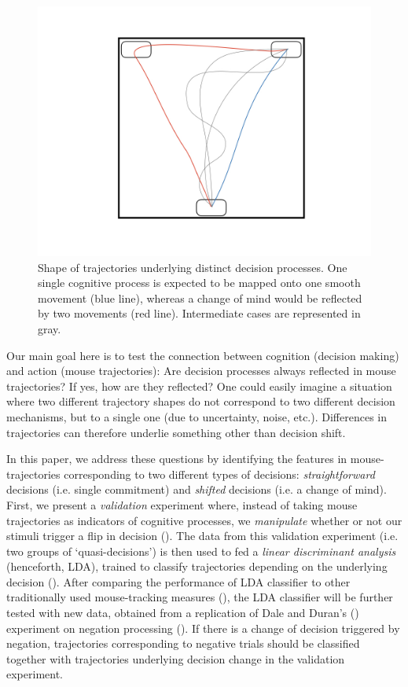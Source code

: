 \documentclass{article}
\begin{document}
\begin{figure}
\centering
\includegraphics[width=\textwidth]{trajectories.jpeg}
\caption{Shape of trajectories underlying distinct decision processes. One single cognitive process is expected to be mapped onto one smooth movement (blue line), whereas a change of mind would be reflected by two movements (red line). Intermediate cases are represented in gray.} \label{fig:scheme.traj}
\end{figure}

Our main goal here is to test the connection between cognition (decision making) and action (mouse trajectories): Are decision processes always reflected in mouse trajectories? If yes, how are they reflected? 
One could easily imagine a situation where two different trajectory shapes do not correspond to two different decision mechanisms, but to a single one (due to uncertainty, noise, etc.). Differences in trajectories can therefore underlie something other than decision shift. 

In this paper, we address these questions by identifying the features in mouse-trajectories corresponding to two different types of decisions: \emph{straightforward} decisions (i.e. single commitment) and \emph{shifted} decisions (i.e. a change of mind). 
First, we present a \emph{validation} experiment where, instead of taking mouse trajectories as indicators of cognitive processes, we \emph{manipulate} whether or not our stimuli trigger a flip in decision (). 
The data from this validation experiment (i.e. two groups of `quasi-decisions') is then used to fed a \emph{linear discriminant analysis} (henceforth, LDA), trained to classify trajectories depending on the underlying decision (). 
After comparing the performance of LDA classifier to other traditionally used mouse-tracking measures (), 
the LDA classifier will be further tested with new data, obtained from a replication of Dale and Duran's (\citeyear{Dale2011}) experiment on negation processing (). If there is a change of decision triggered by negation, trajectories corresponding to negative trials should be classified together with trajectories underlying decision change in the validation experiment. 
\end{document}
